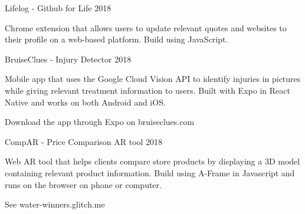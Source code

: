 \begin{cventries}
  \cventry
    {Lifelog - Github for Life} %
    {} %
    {} %
    {2018} %
    {
      \begin{cvitems} %
        \item {Chrome extension that allows users to update relevant quotes and websites to their profile on a web-based platform. Build using JavaScript.}
      \end{cvitems}
    }

  \cventry
    {BruiseClues - Injury Detector} %
    {} %
    {} %
    {2018} %
    {
      \begin{cvitems} %
        \item {Mobile app that uses the Google Cloud Vision API to identify injuries in pictures while giving relevant treatment information to users. Built with Expo in React Native and works on both Android and iOS.}
        \item {Download the app through Expo on bruiseclues.com}
      \end{cvitems}
    }
  \cventry
    {CompAR - Price Comparison AR tool} %
    {} %
    {} %
    {2018} %
    {
      \begin{cvitems} %
        \item {Web AR tool that helps clients compare store products by displaying a 3D model containing relevant product information. Build using A-Frame in Javascript and runs on the browser on phone or computer.}
        \item {See water-winners.glitch.me}
      \end{cvitems}
    }

\end{cventries}
